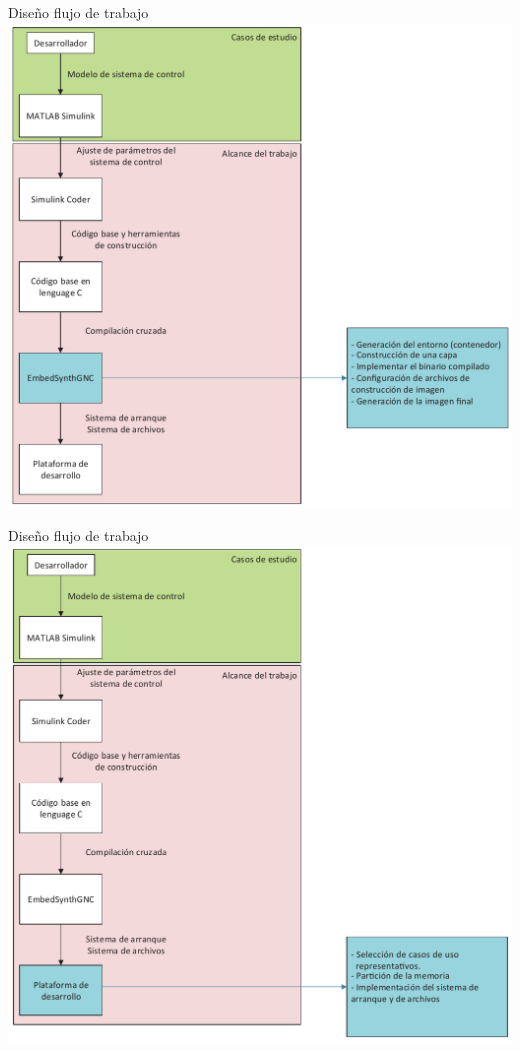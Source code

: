 \documentclass[10pt,aspectratio=169]{beamer} %
\begin{document}
\begin{frame}{Diseño flujo de trabajo}
  \centering
  \includegraphics[scale=0.4]{Diagrama_general_del_proyecto/dgp_4.pdf}
\end{frame}

\begin{frame}{Diseño flujo de trabajo}
  \centering
  \includegraphics[scale=0.4]{Diagrama_general_del_proyecto/dgp5.pdf}
\end{frame}
\end{document}
